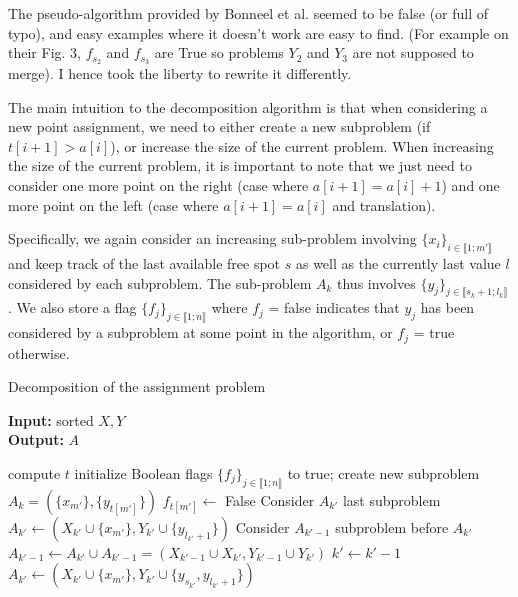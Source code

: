 \documentclass[a4paper,12pt]{article}
\begin{document}
The pseudo-algorithm provided by Bonneel et al. seemed to be false (or full of typo), and easy examples where it doesn't work are easy to find. (For example on their Fig. 3, $f_{s_2}$ and $f_{s_3}$ are True so problems $Y_2$ and $Y_3$ are not supposed to merge). I hence took the liberty to rewrite it differently.

The main intuition to the decomposition algorithm is that when considering a new point assignment, we need to either create a new subproblem (if $t[i+1]>a[i]$), or increase the size of the current problem. When increasing the size of the current problem, it is important to note that we just need to consider one more point on the right (case where $a[i+1] = a[i]+1$) and one more point on the left (case where $a[i+1]=a[i]$ and translation). 

Specifically, we again consider an increasing sub-problem involving $\{x_i\}_{i \in \llbracket 1;m' \rrbracket}$ and keep track of the last available free spot $s$ as well as the currently last value $l$ considered by each subproblem. The sub-problem $A_k$ thus involves $\{y_j\}_{j \in \llbracket s_k+1;l_k \rrbracket}$ . We also store a flag $\{f_j\}_{j \in \llbracket 1;n \rrbracket}$ where $f_j$ = false indicates that $y_j$ has been considered by a subproblem at some point in the algorithm, or $f_j$ = true otherwise. \\

\begin{algorithm}
\caption{Decomposition of the assignment problem}\label{subproblem}
\hspace*{\algorithmicindent} \textbf{Input:} sorted $X,Y$\\
\hspace*{\algorithmicindent} \textbf{Output:} $A$ 
\begin{algorithmic}[1]
\State compute $t$
\State initialize Boolean flags $\{f_j\}_{j \in \llbracket 1;n \rrbracket}$ to true;
	 
		\State create new subproblem $A_k = (\{x_{m'}\},\{y_{t[m']}\})$	
		\State $f_{t[m']} \gets $ False
    \Else
        \State Consider $A_{k'}$ last subproblem
         
        	\State $A_{k'} \gets (X_{k'} \cup \{x_{m'}\}, Y_{k'} \cup \{y_{l_{k'}+1}\})$
        \Else {}
        	 
        		\State Consider $A_{k'-1}$ subproblem before $A_{k'}$
        		\State $A_{k'-1} \gets A_{k'} \cup A_{k'-1} = (X_{k'-1} \cup X_{k'},Y_{k'-1} \cup Y_{k'})$
        		\State $k' \gets k'-1$ 
        	\EndWhile
        	\State $A_{k'} \gets (X_{k'} \cup \{x_{m'}\},Y_{k'} \cup \{y_{s_{k'}},y_{l_{k'}+1}\})$
        \EndIf
    \EndIf
\EndFor
\State {}
\end{algorithmic}
\end{algorithm}
\end{document}
